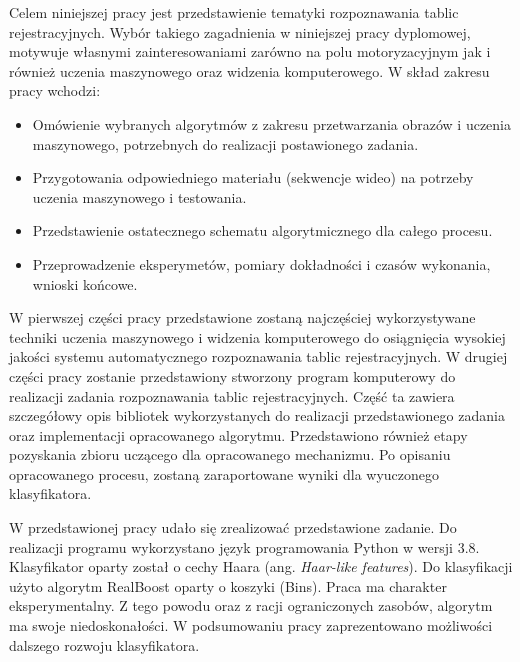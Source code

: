 Celem niniejszej pracy jest przedstawienie tematyki rozpoznawania tablic rejestracyjnych.
Wybór takiego zagadnienia w niniejszej pracy dyplomowej, motywuje własnymi zainteresowaniami zarówno na polu motoryzacyjnym jak i również uczenia maszynowego oraz widzenia komputerowego.
W skład zakresu pracy wchodzi:
\begin{itemize}
    \item Omówienie wybranych algorytmów z zakresu przetwarzania obrazów i uczenia maszynowego, potrzebnych
    do realizacji postawionego zadania.
    \item Przygotowania odpowiedniego materiału (sekwencje wideo) na potrzeby uczenia maszynowego i testowania.
    \item Przedstawienie ostatecznego schematu algorytmicznego dla całego procesu.
    \item Przeprowadzenie eksperymetów, pomiary dokładności i czasów wykonania, wnioski końcowe.
\end{itemize}

W pierwszej części pracy przedstawione zostaną najczęściej wykorzystywane techniki uczenia maszynowego i widzenia komputerowego do osiągnięcia wysokiej jakości systemu automatycznego rozpoznawania tablic rejestracyjnych.
W drugiej części pracy zostanie przedstawiony stworzony program komputerowy do realizacji zadania rozpoznawania tablic rejestracyjnych.
Część ta zawiera szczegółowy opis bibliotek wykorzystanych do realizacji przedstawionego zadania oraz implementacji opracowanego algorytmu.
Przedstawiono również etapy pozyskania zbioru uczącego dla opracowanego mechanizmu.
Po opisaniu opracowanego procesu, zostaną zaraportowane wyniki dla wyuczonego klasyfikatora.

W przedstawionej pracy udało się zrealizować przedstawione zadanie.
Do realizacji programu wykorzystano język programowania Python w wersji 3.8.
Klasyfikator oparty został o cechy Haara (ang. \textit{Haar-like features}).
Do klasyfikacji użyto algorytm RealBoost oparty o koszyki (Bins).
Praca ma charakter eksperymentalny.
Z tego powodu oraz z racji ograniczonych zasobów, algorytm ma swoje niedoskonałości.
W podsumowaniu pracy zaprezentowano możliwości dalszego rozwoju klasyfikatora.
